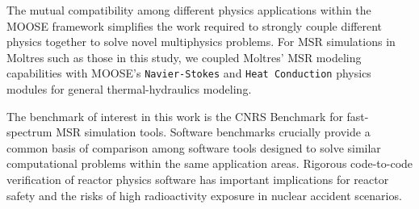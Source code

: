 The mutual compatibility among different physics applications within the
\gls{MOOSE} framework simplifies the work required to strongly couple
different physics together to solve novel multiphysics problems. For \gls{MSR}
simulations in Moltres such as those in this study, we coupled Moltres'
\gls{MSR} modeling capabilities with \gls{MOOSE}'s \texttt{Navier-Stokes} and
\texttt{Heat Conduction} physics modules \cite{peterson_overview_2018} for
general thermal-hydraulics modeling.

The benchmark of interest in this work is the CNRS Benchmark
\citep{tiberga_results_2020} for fast-spectrum \gls{MSR} simulation tools.
Software benchmarks crucially provide a common basis of comparison among
software tools designed
to solve similar computational problems within the same application areas.
Rigorous code-to-code verification of reactor physics software has
important implications for reactor safety and the risks of high
radioactivity exposure in nuclear accident scenarios.
